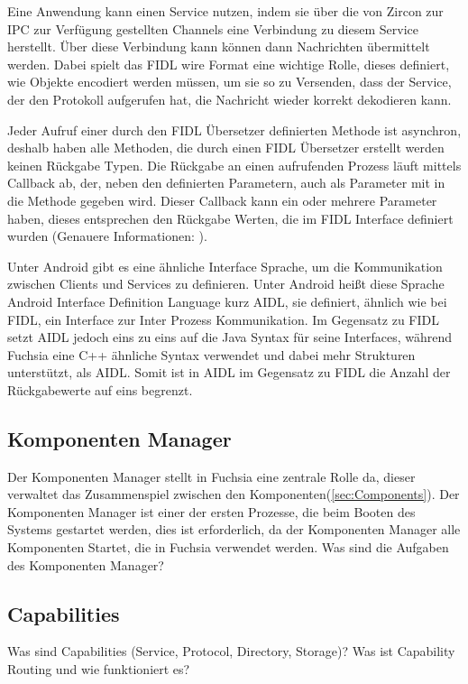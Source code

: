 \documentclass[a4paper]{scrartcl}
\begin{document}
Eine Anwendung kann einen Service nutzen, indem sie über die von Zircon zur IPC zur Verfügung gestellten Channels eine Verbindung zu diesem Service herstellt. Über diese Verbindung kann können dann Nachrichten übermittelt werden. Dabei spielt das FIDL wire Format eine wichtige Rolle, dieses definiert, wie Objekte encodiert werden müssen, um sie so zu Versenden, dass der Service, der den Protokoll aufgerufen hat, die Nachricht wieder korrekt dekodieren kann.

Jeder Aufruf einer durch den FIDL Übersetzer definierten Methode ist asynchron, deshalb haben alle Methoden, die durch einen FIDL Übersetzer erstellt werden keinen Rückgabe Typen. Die Rückgabe an einen aufrufenden Prozess läuft mittels Callback ab, der, neben den definierten Parametern, auch als Parameter mit in die Methode gegeben wird. Dieser Callback kann ein oder mehrere Parameter haben, dieses entsprechen den Rückgabe Werten, die im FIDL Interface definiert wurden (Genauere Informationen: \cite{https://fuchsia.googlesource.com/docs/+/ea2fce2874556205204d3ef70c60e25074dc7ffd/development/languages/fidl/tutorial.md}).

Unter Android gibt es eine ähnliche Interface Sprache, um die Kommunikation zwischen Clients und Services zu definieren. Unter Android heißt diese Sprache Android Interface Definition Language kurz AIDL, sie definiert, ähnlich wie bei FIDL, ein Interface zur Inter Prozess Kommunikation. Im Gegensatz zu FIDL setzt AIDL jedoch eins zu eins auf die Java Syntax für seine Interfaces, während Fuchsia eine C++ ähnliche Syntax verwendet und dabei mehr Strukturen unterstützt, als AIDL. Somit ist in AIDL im Gegensatz zu FIDL die Anzahl der Rückgabewerte auf eins begrenzt.
\subsection{Komponenten Manager}
Der Komponenten Manager stellt in Fuchsia eine zentrale Rolle da, dieser verwaltet das Zusammenspiel zwischen den Komponenten(\ref{sec:Components}). Der Komponenten Manager ist einer der ersten Prozesse, die beim Booten des Systems gestartet werden, dies ist erforderlich, da der Komponenten Manager alle Komponenten Startet, die in Fuchsia verwendet werden. 
Was sind die Aufgaben des Komponenten Manager?
\subsection{Capabilities}
\label{sec:Capabilities}
Was sind Capabilities (Service, Protocol, Directory, Storage)?
Was ist Capability Routing und wie funktioniert es?
\end{document}

